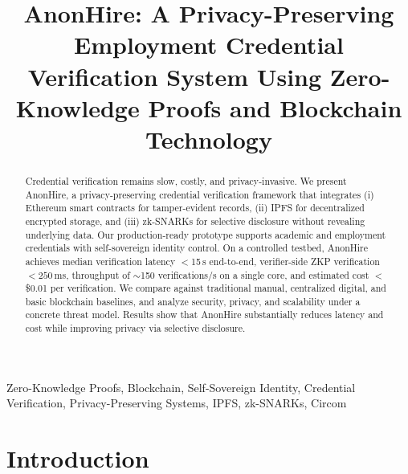 \documentclass[conference]{IEEEtran}
\begin{document}
\title{AnonHire: A Privacy-Preserving Employment Credential Verification System Using Zero-Knowledge Proofs and Blockchain Technology}

\author{
\and
{}
}

\maketitle

\begin{abstract}
Credential verification remains slow, costly, and privacy-invasive. We present AnonHire, a privacy-preserving credential verification framework that integrates (i) Ethereum smart contracts for tamper-evident records, (ii) IPFS for decentralized encrypted storage, and (iii) zk-SNARKs for selective disclosure without revealing underlying data. Our production-ready prototype supports academic and employment credentials with self-sovereign identity control.
On a controlled testbed, AnonHire achieves median verification latency $<$15\,s end-to-end, verifier-side ZKP verification $<\!250$\,ms, throughput of $\sim$150 verifications/s on a single core, and estimated cost $<\!$\$0.01 per verification. We compare against traditional manual, centralized digital, and basic blockchain baselines, and analyze security, privacy, and scalability under a concrete threat model. Results show that AnonHire substantially reduces latency and cost while improving privacy via selective disclosure.
\end{abstract}

\begin{IEEEkeywords}
Zero-Knowledge Proofs, Blockchain, Self-Sovereign Identity, Credential Verification, Privacy-Preserving Systems, IPFS, zk-SNARKs, Circom
\end{IEEEkeywords}

\section{Introduction}
\end{document}
